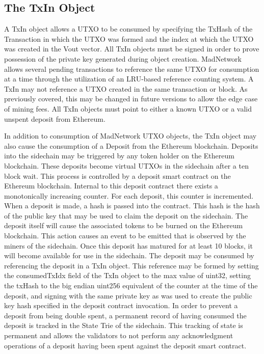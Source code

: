 \subsection{The TxIn Object}



A TxIn object allows a UTXO to be consumed by specifying the TxHash of
the Transaction in which the UTXO was formed and the index at which the
UTXO was created in the Vout vector.
All TxIn objects must be signed in order to prove possession of the
private key generated during object creation.
MadNetwork allows several pending transactions to reference the same
UTXO for consumption at a time through the utilization of an LRU-based
reference counting system.
A TxIn may not reference a UTXO created in the same transaction or
block.
As previously covered, this may be changed in future versions to allow
the edge case of mining fees.
All TxIn objects must point to either a known UTXO or a valid unspent
deposit from Ethereum.

In addition to consumption of MadNetwork UTXO objects, the TxIn object
may also cause the consumption of a Deposit from the Ethereum
blockchain.
Deposits into the sidechain may be triggered by any token holder on the
Ethereum blockchain.
These deposits become virtual UTXOs in the sidechain after a ten block
wait.
This process is controlled by a deposit smart contract on the Ethereum
blockchain.
Internal to this deposit contract there exists a monotonically
increasing counter.
For each deposit, this counter is incremented.
When a deposit is made, a hash is passed into the contract.
This hash is the hash of the public key that may be used to claim the
deposit on the sidechain.
The deposit itself will cause the associated tokens to be burned on the
Ethereum blockchain.
This action causes an event to be emitted that is observed by the
miners of the sidechain.
Once this deposit has matured for at least 10 blocks, it will become
available for use in the sidechain.
The deposit may be consumed by referencing the deposit in a TxIn object.
This reference may be formed by setting the consumedTxIdx field of the
TxIn object to the max value of uint32, setting the txHash to the big
endian uint256 equivalent of the counter at the time of the deposit,
and signing with the same private key as was used to create the public
key hash specified in the deposit contract invocation.
In order to prevent a deposit from being double spent, a permanent
record of having consumed the deposit is tracked in the State Trie of
the sidechain.
This tracking of state is permanent and allows the validators to not
perform any acknowledgment operations of a deposit having been spent
against the deposit smart contract.


